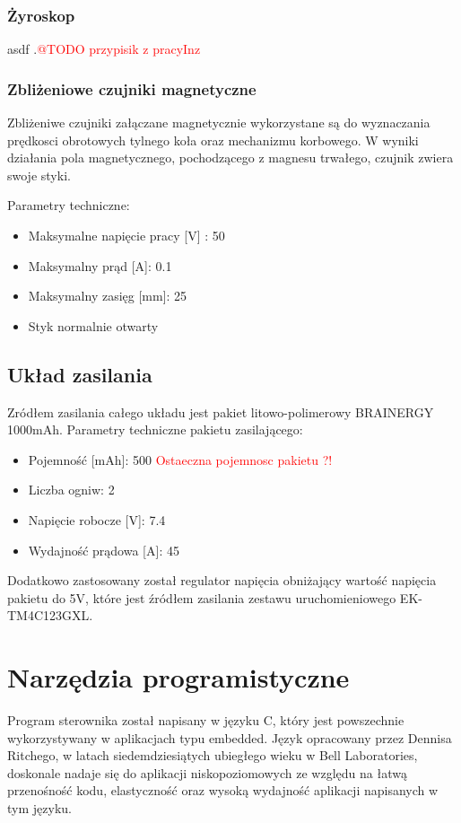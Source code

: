 \subsubsection{Żyroskop}
asdf
.\textcolor{red}{@TODO przypisik z pracyInz}
\subsubsection{Zbliżeniowe czujniki magnetyczne}
Zbliżeniwe czujniki załączane magnetycznie wykorzystane są do wyznaczania prędkosci obrotowych tylnego koła oraz mechanizmu korbowego. W wyniki działania pola magnetycznego, pochodzącego z magnesu trwałego, czujnik zwiera swoje styki. 
 
Parametry techniczne:
\begin{itemize}
\item
Maksymalne napięcie pracy [V] : 50
\item
Maksymalny prąd [A]: 0.1
\item
Maksymalny zasięg [mm]: 25
\item
Styk normalnie otwarty
\end{itemize}
\subsection{Układ zasilania}
Zródłem zasilania całego układu jest pakiet litowo-polimerowy BRAINERGY 1000mAh.
Parametry techniczne pakietu zasilającego:
\begin{itemize}
\item
Pojemność [mAh]: 500 \textcolor{red}{Ostaeczna pojemnosc pakietu ?!}
\item
Liczba ogniw: 2
\item
Napięcie robocze [V]: 7.4
\item
Wydajność prądowa [A]: 45
\end{itemize}

Dodatkowo zastosowany został regulator napięcia obniżający wartość napięcia pakietu do 5V, które jest źródłem zasilania zestawu uruchomieniowego EK-TM4C123GXL.
\section{Narzędzia programistyczne}
Program sterownika został napisany w języku C, który jest powszechnie wykorzystywany w aplikacjach typu embedded. Język opracowany przez Dennisa Ritchego, w latach siedemdziesiątych ubiegłego wieku w Bell Laboratories, doskonale nadaje się do aplikacji niskopoziomowych ze względu na łatwą przenośność kodu, elastyczność oraz wysoką wydajność aplikacji napisanych w tym języku. 
